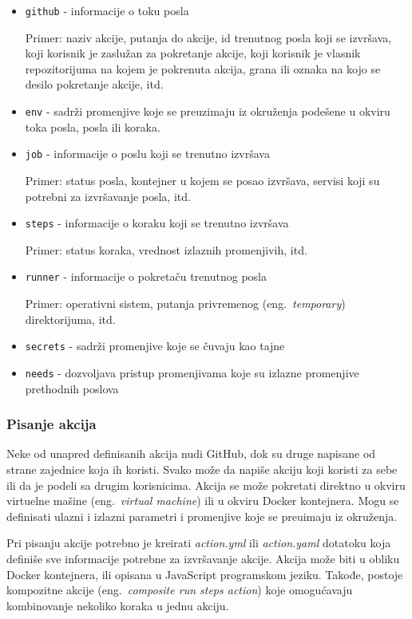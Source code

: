 \documentclass[12pt]{report}
\begin{document}
\begin{itemize}
    \item\texttt{github} - informacije o toku posla

    Primer: naziv akcije, putanja do akcije, id trenutnog posla koji se izvršava, koji korisnik je zaslužan za pokretanje akcije, koji korisnik je vlasnik repozitorijuma na kojem je pokrenuta akcija, grana ili oznaka na kojo se desilo pokretanje akcije, itd.
    \item\texttt{env} - sadrži promenjive koje se preuzimaju iz okruženja podešene u okviru toka posla, posla ili koraka.
    \item\texttt{job} - informacije o poslu koji se trenutno izvršava

    Primer: status posla, kontejner u kojem se posao izvršava, servisi koji su potrebni za izvršavanje posla, itd.
    \item\texttt{steps} - informacije o koraku koji se trenutno izvršava

    Primer: status koraka, vrednost izlaznih promenjivih, itd.
    \item\texttt{runner} - informacije o pokretaču trenutnog posla

    Primer: operativni sistem, putanja privremenog (eng.\ \textit{temporary}) direktorijuma, itd.
    \item\texttt{secrets} - sadrži promenjive koje se čuvaju kao tajne
    \item\texttt{needs} - dozvoljava pristup promenjivama koje su izlazne promenjive prethodnih poslova
\end{itemize}

\subsubsection{Pisanje akcija}
Neke od unapred definisanih akcija nudi GitHub, dok su druge napisane od strane zajednice koja ih koristi. Svako može da napiše akciju koji koristi za sebe ili da je podeli sa drugim korisnicima. Akcija se može pokretati direktno u okviru virtuelne mašine (eng.\ \textit{virtual machine}) ili u okviru Docker kontejnera. Mogu se definisati ulazni i izlazni parametri i promenjive koje se preuimaju iz okruženja.

Pri pisanju akcije potrebno je kreirati \textit{action.yml} ili \textit{action.yaml} dotatoku koja definiše sve informacije potrebne za izvršavanje akcije. Akcija može biti u obliku Docker kontejnera, ili opisana u JavaScript programskom jeziku. Takođe, postoje kompozitne akcije (eng.\ \textit{composite run steps action}) koje omogućavaju kombinovanje nekoliko koraka u jednu akciju.
\end{document}
